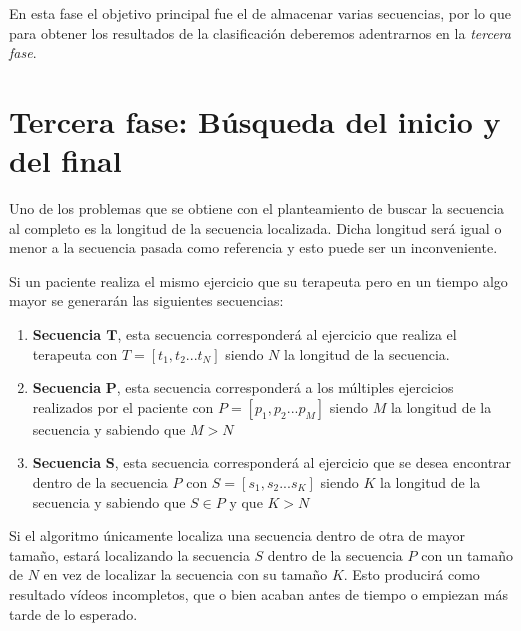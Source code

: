 En esta fase el objetivo principal fue el de almacenar varias secuencias, por lo que para obtener los resultados de la clasificación deberemos adentrarnos en la \emph{tercera fase}.


\section{Tercera fase: Búsqueda del inicio y del final}

Uno de los problemas que se obtiene con el planteamiento de buscar la secuencia al completo es la longitud de la secuencia localizada. Dicha longitud será igual o menor a la secuencia pasada como referencia y esto puede ser un inconveniente. 

Si un paciente realiza el mismo ejercicio que su terapeuta pero en un tiempo algo mayor se generarán las siguientes secuencias:
\begin{enumerate}
    \item \textbf{Secuencia $\textbf{T}$}, esta secuencia corresponderá al ejercicio que realiza el terapeuta con $T=[t_1,t_2...t_N]$ siendo $N$ la longitud de la secuencia.
    \item \textbf{Secuencia} $\textbf{P}$, esta secuencia corresponderá a los múltiples ejercicios realizados por el paciente con $P=[p_1,p_2...p_M]$ siendo $M$ la longitud de la secuencia y sabiendo que $M > N$
    \item \textbf{Secuencia} $\textbf{S}$, esta secuencia corresponderá al ejercicio que se desea encontrar dentro de la secuencia $P$ con $S=[s_1,s_2...s_K]$ siendo $K$ la longitud de la secuencia y sabiendo que $S \in P$ y que $K > N$ 
\end{enumerate}

Si el algoritmo únicamente localiza una secuencia dentro de otra de mayor tamaño, estará localizando la secuencia $S$ dentro de la secuencia $P$ con un tamaño de $N$ en vez de localizar la secuencia con su tamaño $K$. Esto producirá como resultado vídeos incompletos, que o bien acaban antes de tiempo o empiezan más tarde de lo esperado. 

